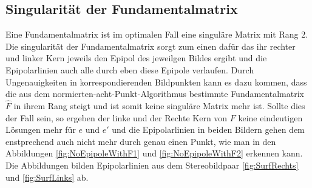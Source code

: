 \subsection{Singularität der Fundamentalmatrix}
\label{sec:realFun}

Eine Fundamentalmatrix ist im optimalen Fall eine singuläre Matrix mit Rang 2. Die singularität der Fundamentalmatrix sorgt zum einen dafür das ihr rechter und linker Kern jeweils den Epipol des jeweilgen Bildes ergibt und die Epipolarlinien auch alle durch eben diese Epipole verlaufen\cite{HZ}. Durch Ungenauigkeiten in korrespondierenden Bildpunkten kann es dazu kommen, dass die aus dem normierten-acht-Punkt-Algorithmus bestimmte Fundamentalmatrix $\hat{F}$ in ihrem Rang steigt und ist somit keine singuläre Matrix mehr ist. Sollte dies der Fall sein, so ergeben der linke und der Rechte Kern von $F$ keine eindeutigen Lösungen mehr für $e$ und $e'$ und die Epipolarlinien in beiden Bildern gehen dem enstprechend auch nicht mehr durch genau einen Punkt, wie man in den Abbildungen \ref{fig:NoEpipoleWithF1} und \ref{fig:NoEpipoleWithF2} erkennen kann. Die Abbildungen bilden Epipolarlinien aus dem Stereobildpaar \ref{fig:SurfRechts} und \ref{fig:SurfLinks} ab.\\

\pagebreak
%
%
%

